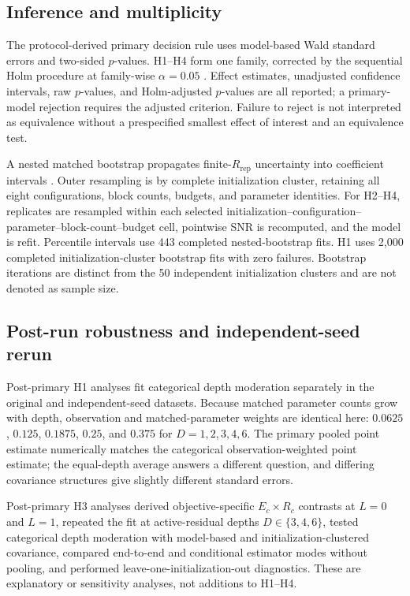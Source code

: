 \documentclass[pdflatex,sn-basic,Numbered]{sn-jnl}
\begin{document}
\subsection{Inference and multiplicity}

The protocol-derived primary decision rule uses model-based Wald standard errors and two-sided $p$-values. H1--H4 form one family, corrected by the sequential Holm procedure at family-wise $\alpha=0.05$ \cite{holm1979sequential}. Effect estimates, unadjusted confidence intervals, raw $p$-values, and Holm-adjusted $p$-values are all reported; a primary-model rejection requires the adjusted criterion. Failure to reject is not interpreted as equivalence without a prespecified smallest effect of interest and an equivalence test.

A nested matched bootstrap propagates finite-$R_{\mathrm{rep}}$ uncertainty into coefficient intervals \cite{davison1997bootstrap}. Outer resampling is by complete initialization cluster, retaining all eight configurations, block counts, budgets, and parameter identities. For H2--H4, replicates are resampled within each selected initialization--configuration--parameter--block-count--budget cell, pointwise SNR is recomputed, and the model is refit. Percentile intervals use 443 completed nested-bootstrap fits. H1 uses 2,000 completed initialization-cluster bootstrap fits with zero failures. Bootstrap iterations are distinct from the 50 independent initialization clusters and are not denoted as sample size.


\subsection{Post-run robustness and independent-seed rerun}\label{sec:h2-depth-methods}

Post-primary H1 analyses fit categorical depth moderation separately in the original and independent-seed datasets. Because matched parameter counts grow with depth, observation and matched-parameter weights are identical here: $0.0625$, $0.125$, $0.1875$, $0.25$, and $0.375$ for $D=1,2,3,4,6$. The primary pooled point estimate numerically matches the categorical observation-weighted point estimate; the equal-depth average answers a different question, and differing covariance structures give slightly different standard errors.

Post-primary H3 analyses derived objective-specific $E_c\times R_c$ contrasts at $L=0$ and $L=1$, repeated the fit at active-residual depths $D\in\{3,4,6\}$, tested categorical depth moderation with model-based and initialization-clustered covariance, compared end-to-end and conditional estimator modes without pooling, and performed leave-one-initialization-out diagnostics. These are explanatory or sensitivity analyses, not additions to H1--H4.
\end{document}
